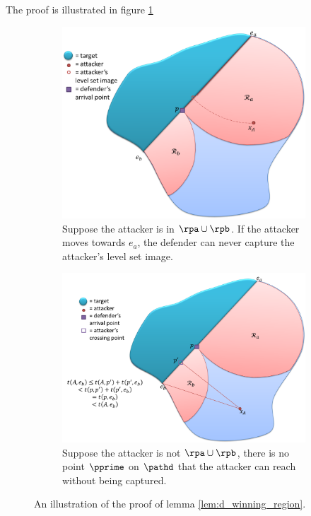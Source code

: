 The proof is illustrated in figure \ref{fig:lemma1}

\begin{figure}[h]
\centering
	\begin{subfigure}{0.45\textwidth}
	\centering
	\includegraphics[width=\textwidth]{"fig/pd proof 1"}
	\caption{Suppose the attacker is in $\rpa\cup\rpb$. If the attacker moves towards $e_a$, the defender can never capture the attacker's level set image.}
	\end{subfigure} \quad
	\begin{subfigure}{0.45\textwidth}
	\centering
	\includegraphics[width=\textwidth]{"fig/pd proof 2"}
	\caption{Suppose the attacker is not $\rpa\cup\rpb$, there is no point $\pprime$ on $\pathd$ that the attacker can reach without being captured.}
	\end{subfigure}
\caption{An illustration of the proof of lemma \ref{lem:d_winning_region}.}
\label{fig:lemma1}
\end{figure}

